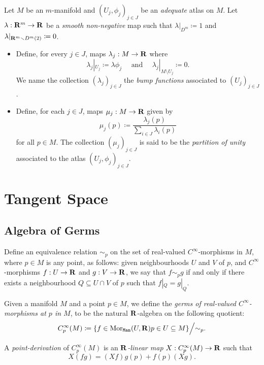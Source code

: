 \begin{definition}
\label{def:}
Let \(M\) be an \(m\)-manifold and \((U_{j}, \phi_j)_{j \in J}\) be an
\emph{adequate} atlas on \(M\). Let \(\lambda: \mathbf{R}^m \to \mathbf{R}\) be a \emph{smooth
  non-negative} map such that \(\lambda|_{D^m} \coloneq 1\) and
\(\lambda|_{\mathbf{R}^m \smallsetminus D^m(2)} \coloneq 0\).
\begin{itemize}\setlength\itemsep{0em}
\item Define, for every \(j \in J\), maps \(\lambda_j: M \to \mathbf{R}\) where
  \[
  \lambda_j|_{U_j} \coloneq \lambda \phi_j
  \quad\text{ and }\quad
  \lambda_j|_{M \setminus U_j} \coloneq 0.
  \]
  We name the collection \((\lambda_j)_{j \in J}\) the \emph{bump functions}
  associated to \((U_j)_{j \in J}\).
\item Define, for each \(j \in J\), maps \(\mu_j: M \to \mathbf{R}\) given by
  \[
  \mu_j(p) \coloneq \frac{\lambda_j(p)}{\sum_{i \in J} \lambda_i(p)}
  \]
  for all \(p \in M\). The collection \((\mu_j)_{j \in J}\) is said to be the
  \emph{partition of unity} associated to the atlas \((U_j, \phi_j)_{j \in J}\).
\end{itemize}
\end{definition}


\section{Tangent Space}

\subsection{Algebra of Germs}

Define an equivalence relation \(\sim_p\) on the set of real-valued
\(C^{\infty}\)-morphisms in \(M\), where \(p \in M\) is any point, as follows:
given neighbourhoods \(U\) and \(V\) of \(p\), and \(C^{\infty}\)-morphisms
\(f: U \to \mathbf{R}\) and \(g: V \to \mathbf{R}\), we say that \(f \sim_p g\) if and only if
there exists a neighbourhood \(Q \subseteq U \cap V\) of \(p\) such that
\(f|_Q = g|_Q\).

\begin{definition}
\label{def:algebra-of-germs-manifold}
Given a manifold \(M\) and a point \(p \in M\), we define the \emph{germs of
  real-valued \(C^{\infty}\)-morphisms at \(p\) in \(M\)}, to be the natural
\(\mathbf{R}\)-algebra on the following quotient:
\[
C_p^{\infty}(M) \coloneq
\{f \in \operatorname{Mor}_{{\texttt{Man}}}(U, \mathbf{R}) \relax p \in U \subseteq M\}
\Big/{\sim_p}.
\]

A \emph{point-derivation} of \(C_p^{\infty}(M)\) is an \emph{\(\mathbf{R}\)-linear map}
\(X: C_p^{\infty}(M) \to \mathbf{R}\) such that
\[
X(f g) = (X f) g(p) + f(p) (X g).
\]
\end{definition}

